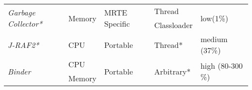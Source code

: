 \begin{table}
\begin{tabular}{|l|l|l|l|l|}
\hline
\multirow{2}{*}{\textit{Garbage Collector*}} & \multirow{2}{*}{Memory} & \multirow{2}{*}{MRTE Specific} & Thread & \multirow{2}{*}{low(1\%)} \\
& & & Classloader & \\
\hline
\textit{J-RAF2*} & CPU & Portable & Thread* & medium (37\%) \\
\hline
\multirow{2}{*}{\textit{Binder} \cite{Binder:2009:PPV:1464245.1464249,Binder200645}} & CPU & \multirow{2}{*}{Portable} & \multirow{2}{*}{Arbitrary*} & \multirow{2}{*}{high (80-300 \%)} \\
& Memory & & & \\
\hline
\end{tabular}
\end{table}




